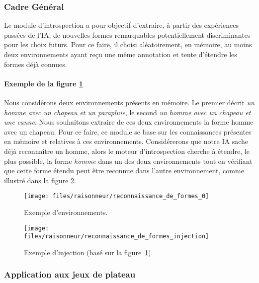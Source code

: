 \label{subsection_introspection}
\subsubsection{Cadre Général}

Le module d'introspection a pour objectif d'extraire, à partir des expériences passées de l'IA, de nouvelles formes remarquables potentiellement discriminantes pour les choix futurs. Pour ce faire, il choisi aléatoirement, en mémoire, au moins deux environnements ayant reçu une même annotation et tente d'étendre les formes déjà connues.

\paragraph{Exemple de la figure \ref{img_reco_forme_0}}
Nous considérons deux environnements présents en mémoire. Le premier décrit \emph{un homme avec un chapeau et un parapluie}, le second \emph{un homme avec un chapeau et une canne}. Nous souhaitons extraire de ces deux environnements la forme homme avec un chapeau. Pour ce faire, ce module se base sur les connaissances présentes en mémoire et relatives à ces environnements. Considérerons que notre IA sache déjà reconnaître un homme, alors le moteur d'introspection cherche à étendre, le plus possible, la forme \emph{homme} dans un des deux environnements tout en vérifiant que cette forme étendu peut être reconnue dans l'autre environnement, comme illustré dans la figure \ref{img_reco_forme_injection}.

\begin{figure}[H] 
\begin{center}
\texttt{[image: files/raisonneur/reconnaissance\_de\_formes\_0]} 
\end{center}
\caption{Exemple d'environnements.}
\label{img_reco_forme_0}
\end{figure}

\begin{figure}[H] 
\begin{center}
\texttt{[image: files/raisonneur/reconnaissance\_de\_formes\_injection]} 
\end{center}
\caption{Exemple d'injection (basé sur la figure~\ref{img_reco_forme_0}).}
\label{img_reco_forme_injection}
\end{figure}

\subsubsection{Application aux jeux de plateau}

